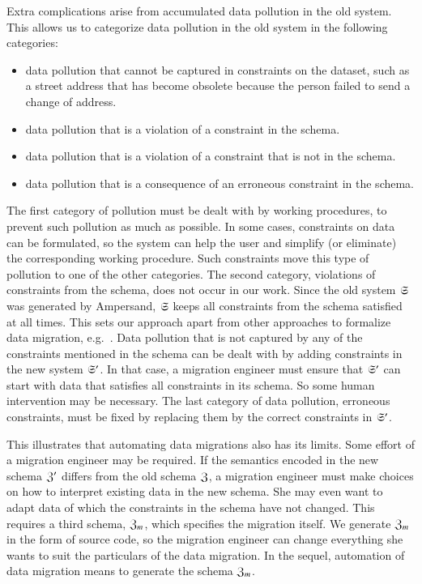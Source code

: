\documentclass{elsarticle}
\begin{document}
   Extra complications arise from accumulated data pollution in the old system.
   This allows us to categorize data pollution in the old system in the following categories:
   \begin{itemize}
      \item data pollution that cannot be captured in constraints on the dataset,
      such as a street address that has become obsolete because the person failed to send a change of address.
      \item data pollution that is a violation of a constraint in the schema.
      \item data pollution that is a violation of a constraint that is not in the schema.
      \item data pollution that is a consequence of an erroneous constraint in the schema.
   \end{itemize}
   The first category of pollution must be dealt with by working procedures, to prevent such pollution as much as possible.
   In some cases, constraints on data can be formulated,
   so the system can help the user and simplify (or eliminate) the corresponding working procedure.
   Such constraints move this type of pollution to one of the other categories.
   The second category, violations of constraints from the schema, does not occur in our work.
   Since the old system $\mathfrak{S}$ was generated by Ampersand,
   $\mathfrak{S}$ keeps all constraints from the schema satisfied at all times.
   This sets our approach apart from other approaches to formalize data migration, e.g.~\cite{Thalheim2013}.
   Data pollution that is not captured by any of the constraints mentioned in the schema
   can be dealt with by adding constraints in the new system $\mathfrak{S}'$.
   In that case, a migration engineer must ensure that $\mathfrak{S}'$ can start with data that satisfies all constraints in its schema.
   So some human intervention may be necessary.
   The last category of data pollution, erroneous constraints, must be fixed by replacing them by the correct constraints in $\mathfrak{S}'$.

   This illustrates that automating data migrations also has its limits.
   Some effort of a migration engineer may be required.
   If the semantics encoded in the new schema $\mathfrak{Z}'$ differs from the old schema $\mathfrak{Z}$,
   a migration engineer must make choices on how to interpret existing data in the new schema.
   She may even want to adapt data of which the constraints in the schema have not changed.
   This requires a third schema, $\mathfrak{Z}_m$, which specifies the migration itself.
   We generate $\mathfrak{Z}_m$ in the form of source code, so the migration engineer can change everything she wants to suit the particulars of the data migration.
   In the sequel, automation of data migration means to generate the schema $\mathfrak{Z}_m$.
\end{document}
